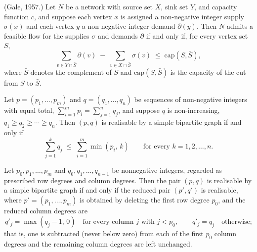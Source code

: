 \begin{theorem}
\label{Networks.gale_feasible_flow}
\leanok
{}
(Gale, 1957.) Let $N$ be a network with source set $X$, sink set $Y$, and capacity
function $c$, and suppose each vertex $x$ is assigned a non-negative integer supply
$\sigma(x)$ and each vertex $y$ a non-negative integer demand $\partial(y)$. Then $N$
admits a feasible flow for the supplies $\sigma$ and demands $\partial$ if and only if,
for every vertex set $S$,
\[
\sum_{v \in Y \cap \bar S} \partial(v) \;-\; \sum_{v \in X \cap \bar S} \sigma(v)
\;\le\; \mathrm{cap}(S, \bar S),
\]
where $\bar S$ denotes the complement of $S$ and $\mathrm{cap}(S,\bar S)$ is the
capacity of the cut from $S$ to $\bar S$.
\end{theorem}

\begin{theorem}
\label{Networks.galeRyser_realisable}
\leanok
{}
Let $p=(p_1,\dots,p_m)$ and $q=(q_1,\dots,q_n)$ be sequences of non-negative integers
with equal total, $\sum_{i=1}^{m} p_i = \sum_{j=1}^{n} q_j$, and suppose $q$ is
non-increasing, $q_1 \ge q_2 \ge \cdots \ge q_n$. Then $(p,q)$ is realisable by a simple
bipartite graph if and only if
\[
\sum_{j=1}^{k} q_j \;\le\; \sum_{i=1}^{m} \min(p_i,\, k)
\qquad\text{for every } k = 1, 2, \dots, n.
\]
\end{theorem}

\begin{theorem}
\label{Networks.realisable_iff_reduced}
\leanok
{}
Let $p_0, p_1, \ldots, p_m$ and $q_0, q_1, \ldots, q_{n-1}$ be nonnegative integers,
regarded as prescribed row degrees and column degrees. Then the pair $(p, q)$ is
realisable by a simple bipartite graph if and only if the reduced pair $(p', q')$ is
realisable, where $p' = (p_1, \ldots, p_m)$ is obtained by deleting the first row degree
$p_0$, and the reduced column degrees are
\[
q'_j = \max(q_j - 1,\, 0) \quad\text{for every column } j \text{ with } j < p_0, \qquad
q'_j = q_j \quad\text{otherwise;}
\]
that is, one is subtracted (never below zero) from each of the first $p_0$ column
degrees and the remaining column degrees are left unchanged.
\end{theorem}

